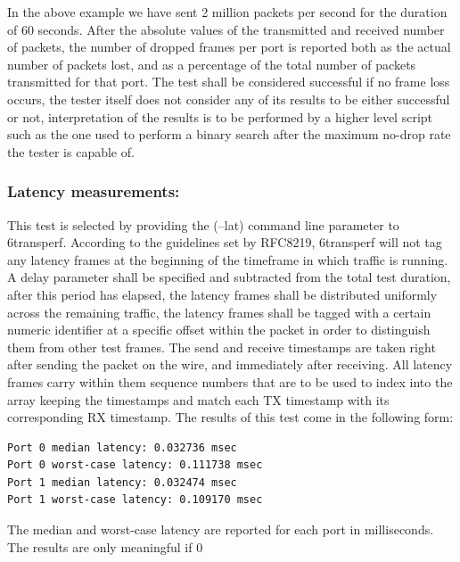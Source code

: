 \documentclass[a4paper,12p,titlepage]{article}
\begin{document}
In the above example we have sent 2 million packets per second for the duration of 60 seconds. After the absolute values of the transmitted and received number of packets, the number of dropped frames per port is reported both as the actual number of packets lost, and as a percentage of the total number of packets transmitted for that port.
The test shall be considered successful if no frame loss occurs, the tester itself does not consider any of its results to be either successful or not, interpretation of the results is to be performed by a higher level script such as the one used to perform a binary search after the maximum no-drop rate the tester is capable of.

\subsubsection{Latency measurements:}

This test is selected by providing the (--lat) command line parameter to 6transperf. According to the guidelines set by RFC8219, 6transperf will not tag any latency frames at the beginning of the timeframe in which traffic is running. A delay parameter shall be specified and subtracted from the total test duration, after this period has elapsed, the latency frames shall be distributed uniformly across the remaining traffic, the latency frames shall be tagged with a certain numeric identifier at a specific offset within the packet in order to distinguish them from other test frames. The send and receive timestamps are taken right after sending the packet on the wire, and immediately after receiving. All latency frames carry within them sequence numbers that are to be used to index into the array keeping the timestamps and match each TX timestamp with its corresponding RX timestamp. The results of this test come in the following form:

\begin{lstlisting}
Port 0 median latency: 0.032736 msec
Port 0 worst-case latency: 0.111738 msec
Port 1 median latency: 0.032474 msec
Port 1 worst-case latency: 0.109170 msec
\end{lstlisting}

The median and worst-case latency are reported for each port in milliseconds. The results are only meaningful if 0%
\end{document}
